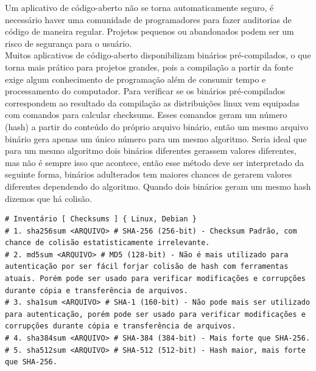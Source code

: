 \documentclass[12pt,a4paper]{article}
\begin{document}
\newpage

Um aplicativo de código-aberto não se torna automaticamente seguro, é necessário haver uma comunidade de programadores para fazer auditorias de código de maneira regular. Projetos pequenos ou abandonados podem ser um risco de segurança para o usuário. \\

















Muitos aplicativos de código-aberto disponibilizam binários pré-compilados, o que torna mais prático para projetos grandes, pois a compilação a partir da fonte exige algum conhecimento de programação além de consumir tempo e processamento do computador. Para verificar se os binários pré-compilados correspondem ao resultado da compilação as distribuições linux vem equipadas com comandos para calcular checksums. Esses comandos geram um número (hash) a partir do conteúdo do próprio arquivo binário, então um mesmo arquivo binário gera apenas um único número para um mesmo algoritmo. Seria ideal que para um mesmo algoritmo dois binários diferentes gerassem valores diferentes, mas não é sempre isso que acontece, então esse método deve ser interpretado da seguinte forma, binários adulterados tem maiores chances de gerarem valores diferentes dependendo do algoritmo. Quando dois binários geram um mesmo hash dizemos que há colisão. \\

\begin{lstlisting}
# Inventário [ Checksums ] { Linux, Debian }
# 1. sha256sum <ARQUIVO> # SHA-256 (256-bit) - Checksum Padrão, com chance de colisão estatisticamente irrelevante. 
# 2. md5sum <ARQUIVO> # MD5 (128-bit) - Não é mais utilizado para autenticação por ser fácil forjar colisão de hash com ferramentas atuais. Porém pode ser usado para verificar modificações e corrupções durante cópia e transferência de arquivos. 
# 3. sha1sum <ARQUIVO> # SHA-1 (160-bit) - Não pode mais ser utilizado para autenticação, porém pode ser usado para verificar modificações e corrupções durante cópia e transferência de arquivos.
# 4. sha384sum <ARQUIVO> # SHA-384 (384-bit) - Mais forte que SHA-256.
# 5. sha512sum <ARQUIVO> # SHA-512 (512-bit) - Hash maior, mais forte que SHA-256.
\end{lstlisting}
\end{document}
